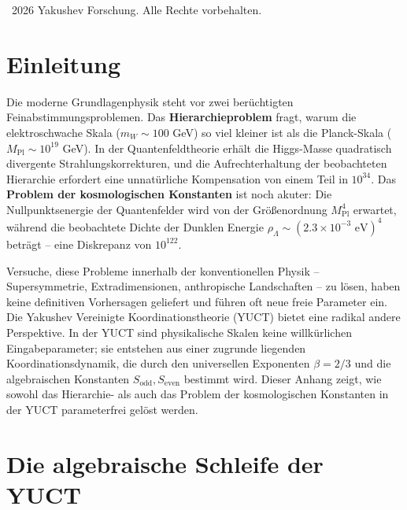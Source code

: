 \documentclass[11pt,a4paper]{article}
\theoremstyle{remark}
\begin{document}
	\vspace{0.5cm}
	\noindent
	\textcopyright\ 2026 Yakushev Forschung. Alle Rechte vorbehalten.
	
	\tableofcontents
	\newpage
	
	\section{Einleitung}
	
	Die moderne Grundlagenphysik steht vor zwei berüchtigten Feinabstimmungsproblemen. Das \textbf{Hierarchieproblem} fragt, warum die elektroschwache Skala (\(m_W \sim 100\) GeV) so viel kleiner ist als die Planck-Skala (\(M_{\mathrm{Pl}} \sim 10^{19}\) GeV). In der Quantenfeldtheorie erhält die Higgs-Masse quadratisch divergente Strahlungskorrekturen, und die Aufrechterhaltung der beobachteten Hierarchie erfordert eine unnatürliche Kompensation von einem Teil in \(10^{34}\). Das \textbf{Problem der kosmologischen Konstanten} ist noch akuter: Die Nullpunktsenergie der Quantenfelder wird von der Größenordnung \(M_{\mathrm{Pl}}^4\) erwartet, während die beobachtete Dichte der Dunklen Energie \(\rho_\Lambda \sim (2.3 \times 10^{-3} \text{ eV})^4\) beträgt – eine Diskrepanz von \(10^{122}\).
	
	Versuche, diese Probleme innerhalb der konventionellen Physik – Supersymmetrie, Extradimensionen, anthropische Landschaften – zu lösen, haben keine definitiven Vorhersagen geliefert und führen oft neue freie Parameter ein. Die Yakushev Vereinigte Koordinationstheorie (YUCT) bietet eine radikal andere Perspektive. In der YUCT sind physikalische Skalen keine willkürlichen Eingabeparameter; sie entstehen aus einer zugrunde liegenden Koordinationsdynamik, die durch den universellen Exponenten \(\beta = 2/3\) und die algebraischen Konstanten \(S_{\mathrm{odd}}, S_{\mathrm{even}}\) bestimmt wird. Dieser Anhang zeigt, wie sowohl das Hierarchie- als auch das Problem der kosmologischen Konstanten in der YUCT parameterfrei gelöst werden.
	
	\section{Die algebraische Schleife der YUCT}
	
\end{document}
